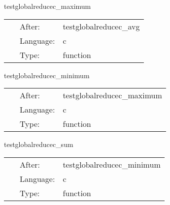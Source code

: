 
\hspace{5mm} testglobalreducec\_maximum 

\hspace{5mm}{\it test out maximum reduction } 


\hspace{5mm}

 \begin{tabular*}{160mm}{cll} 
~ & After:  & testglobalreducec\_avg \\ 
~ & Language:  & c \\ 
~ & Type:  & function \\ 
\end{tabular*} 


\vspace{5mm}


\hspace{5mm} testglobalreducec\_minimum 

\hspace{5mm}{\it test out minimum reduction } 


\hspace{5mm}

 \begin{tabular*}{160mm}{cll} 
~ & After:  & testglobalreducec\_maximum \\ 
~ & Language:  & c \\ 
~ & Type:  & function \\ 
\end{tabular*} 


\vspace{5mm}


\hspace{5mm} testglobalreducec\_sum 

\hspace{5mm}{\it test out sum reduction } 


\hspace{5mm}

 \begin{tabular*}{160mm}{cll} 
~ & After:  & testglobalreducec\_minimum \\ 
~ & Language:  & c \\ 
~ & Type:  & function \\ 
\end{tabular*} 


\vspace{5mm}

